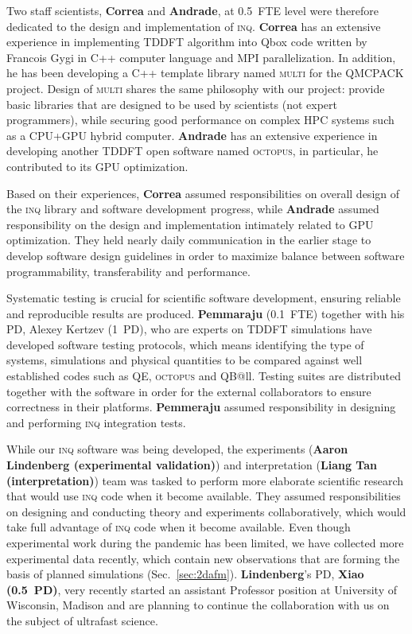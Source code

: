 Two staff scientists, {\bf Correa} and {\bf Andrade}, at 0.5~FTE level were therefore dedicated to the design and implementation of \textsc{inq}. 
{\bf Correa} has an extensive experience in implementing TDDFT algorithm into Qbox code written by Francois Gygi in C++ computer language and MPI parallelization. 
In addition, he has been developing a C++ template library named \textsc{multi} for the QMCPACK project.
Design of \textsc{multi} shares the same philosophy with our project: provide basic libraries that are designed to be used by scientists (not expert programmers), while securing good performance on complex HPC systems such as a CPU+GPU hybrid computer. 
{\bf Andrade} has an extensive experience in developing another TDDFT open software named \textsc{octopus}, in particular, he contributed to its GPU optimization.  

Based on their experiences, {\bf Correa} assumed responsibilities on overall design of the \textsc{inq} library and software development progress, while {\bf Andrade} assumed responsibility on the design and implementation intimately related to GPU optimization. 
They held nearly daily communication in the earlier stage to develop software design guidelines in order to maximize balance between software programmability, transferability and performance. 

Systematic testing is crucial for scientific software development, 
ensuring reliable and reproducible results are produced. 
{\bf Pemmaraju} (0.1~FTE) together with his PD, Alexey Kertzev (1~PD), who are experts on TDDFT simulations have developed software testing protocols, which means identifying the type of systems, simulations and physical quantities to be compared against well established codes such as QE, 
\textsc{octopus} and QB@ll. 
Testing suites are distributed together with the software in order for the external collaborators to ensure correctness in their platforms.
{\bf Pemmeraju} assumed responsibility in designing and performing \textsc{inq} integration tests.

While our \textsc{inq} software was being developed, the experiments ({\bf Aaron Lindenberg (experimental validation)}) and interpretation ({\bf Liang Tan (interpretation)}) team was tasked to perform more elaborate scientific research that would use \textsc{inq} code when it become available. 
They assumed responsibilities on designing and conducting theory and experiments collaboratively, which would take full advantage of \textsc{inq} code when it become available. Even though experimental work during the pandemic has been limited, we have collected more experimental data recently, which contain new observations that are forming the basis of planned simulations (Sec.~\ref{sec:2dafm}). 
{\bf Lindenberg}'s PD, {\bf Xiao (0.5~PD)}, very recently started an assistant Professor position at University of Wisconsin, Madison and are planning to continue the collaboration with us on the subject of ultrafast science.

